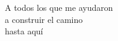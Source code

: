 \begin{dedication}
    A todos los que me ayudaron \\a construir el camino\\ hasta aquí
\end{dedication}